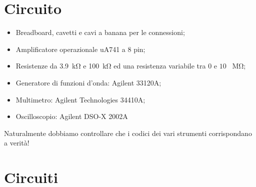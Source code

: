\section*{Circuito}

\begin{itemize}
    \item{Breadboard, cavetti e cavi a banana per le connessioni;}
    \item{Amplificatore operazionale uA741 a 8 pin;}
    \item{Resistenze da \SI{3.9}{\kilo\ohm} e \SI{100}{\kilo\ohm} ed una resistenza variabile tra $0$ e $10$ \SI{}{\mega\ohm};}
    \item{Generatore di funzioni d'onda: Agilent 33120A;}
    \item{Multimetro: Agilent Technologies 34410A;}
    \item{Oscilloscopio: Agilent DSO-X 2002A}
\end{itemize}

Naturalmente dobbiamo controllare che i codici dei vari strumenti corrispondano a verità!

\section*{Circuiti}
